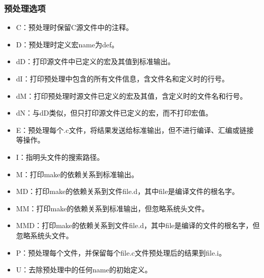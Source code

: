 \documentclass[a4paper,12pt,english]{sphinxmanual}
\begin{document}
\subsubsection{预处理选项}
\label{\detokenize{compiler/pgi:id8}}\label{\detokenize{compiler/pgi:id9}}\begin{itemize}
\item {} 
\sphinxAtStartPar
\sphinxhyphen{}C：预处理时保留C源文件中的注释。

\item {} 
\sphinxAtStartPar
\sphinxhyphen{}D：预处理时定义宏name为def。

\item {} 
\sphinxAtStartPar
\sphinxhyphen{}dD：打印源文件中已定义的宏及其值到标准输出。

\item {} 
\sphinxAtStartPar
\sphinxhyphen{}dI：打印预处理中包含的所有文件信息，含文件名和定义时的行号。

\item {} 
\sphinxAtStartPar
\sphinxhyphen{}dM：打印预处理时源文件已定义的宏及其值，含定义时的文件名和行号。

\item {} 
\sphinxAtStartPar
\sphinxhyphen{}dN：与\sphinxhyphen{}dD类似，但只打印源文件已定义的宏，而不打印宏值。

\item {} 
\sphinxAtStartPar
\sphinxhyphen{}E：预处理每个.c文件，将结果发送给标准输出，但不进行编译、汇编或链接等操作。

\item {} 
\sphinxAtStartPar
\sphinxhyphen{}I：指明头文件的搜索路径。

\item {} 
\sphinxAtStartPar
\sphinxhyphen{}M：打印make的依赖关系到标准输出。

\item {} 
\sphinxAtStartPar
\sphinxhyphen{}MD：打印make的依赖关系到文件file.d，其中file是编译文件的根名字。

\item {} 
\sphinxAtStartPar
\sphinxhyphen{}MM：打印make的依赖关系到标准输出，但忽略系统头文件。

\item {} 
\sphinxAtStartPar
\sphinxhyphen{}MMD：打印make的依赖关系到文件file.d，其中file是编译的文件的根名字，但忽略系统头文件。

\item {} 
\sphinxAtStartPar
\sphinxhyphen{}P：预处理每个文件，并保留每个file.c文件预处理后的结果到file.i。

\item {} 
\sphinxAtStartPar
\sphinxhyphen{}U：去除预处理中的任何name的初始定义。

\end{itemize}
\end{document}
